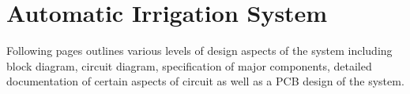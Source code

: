 \newpage
\chapter{Automatic Irrigation System}
Following pages outlines various levels of design aspects of the system including block diagram, circuit diagram, specification of major components, detailed documentation of certain aspects of circuit as well as a PCB design of the system.




